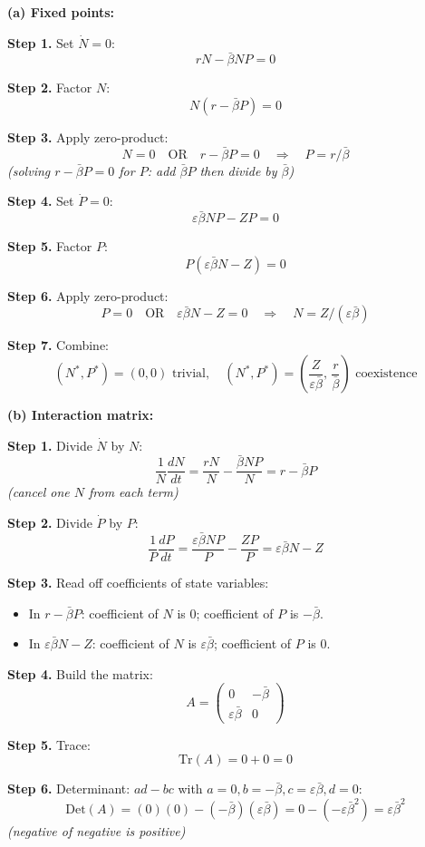 \documentclass[10pt]{article}
\newcommand{\thus}{\quad\Longrightarrow\quad}
\newcommand{\stepwhy}[1]{\textcolor{blue!60!black}{\small\textit{(#1)}}}
\begin{document}
\begin{solution}
\textbf{(a) Fixed points:}

\textbf{Step 1.} Set $\dot N = 0$:
\[
rN - \bar\beta NP = 0
\]

\textbf{Step 2.} Factor $N$:
\[
N(r - \bar\beta P) = 0
\]

\textbf{Step 3.} Apply zero-product:
\[
N=0 \quad\text{OR}\quad r-\bar\beta P = 0 \thus P = r/\bar\beta
\]
\stepwhy{solving $r - \bar\beta P = 0$ for $P$: add $\bar\beta P$ then divide by $\bar\beta$}

\textbf{Step 4.} Set $\dot P = 0$:
\[
\varepsilon\bar\beta NP - ZP = 0
\]

\textbf{Step 5.} Factor $P$:
\[
P(\varepsilon\bar\beta N - Z) = 0
\]

\textbf{Step 6.} Apply zero-product:
\[
P = 0 \quad\text{OR}\quad \varepsilon\bar\beta N - Z = 0 \thus N = Z/(\varepsilon\bar\beta)
\]

\textbf{Step 7.} Combine:
\[
\boxed{(N^*, P^*) = (0, 0) \text{ trivial}, \quad (N^*, P^*) = \left(\frac{Z}{\varepsilon\bar\beta},\,\frac{r}{\bar\beta}\right) \text{ coexistence}}
\]

\medskip\textbf{(b) Interaction matrix:}

\textbf{Step 1.} Divide $\dot N$ by $N$:
\[
\frac{1}{N}\frac{dN}{dt} = \frac{rN}{N} - \frac{\bar\beta NP}{N} = r - \bar\beta P
\]
\stepwhy{cancel one $N$ from each term}

\textbf{Step 2.} Divide $\dot P$ by $P$:
\[
\frac{1}{P}\frac{dP}{dt} = \frac{\varepsilon\bar\beta NP}{P} - \frac{ZP}{P} = \varepsilon\bar\beta N - Z
\]

\textbf{Step 3.} Read off coefficients of state variables:
\begin{itemize}
\item In $r - \bar\beta P$: coefficient of $N$ is 0; coefficient of $P$ is $-\bar\beta$.
\item In $\varepsilon\bar\beta N - Z$: coefficient of $N$ is $\varepsilon\bar\beta$; coefficient of $P$ is 0.
\end{itemize}

\textbf{Step 4.} Build the matrix:
\[
A = \begin{pmatrix} 0 & -\bar\beta \\ \varepsilon\bar\beta & 0 \end{pmatrix}
\]

\textbf{Step 5.} Trace:
\[
\text{Tr}(A) = 0 + 0 = 0
\]

\textbf{Step 6.} Determinant: $ad - bc$ with $a=0, b=-\bar\beta, c=\varepsilon\bar\beta, d=0$:
\[
\text{Det}(A) = (0)(0) - (-\bar\beta)(\varepsilon\bar\beta) = 0 - (-\varepsilon\bar\beta^2) = \varepsilon\bar\beta^2
\]
\stepwhy{negative of negative is positive}


\end{solution}
\end{document}
